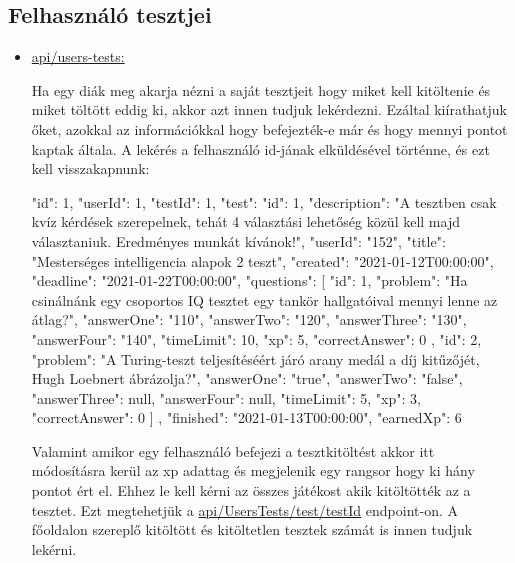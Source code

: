 \subsection{Felhasználó tesztjei}
\begin{itemize}[label={$\bullet$}, topsep=0pt, itemsep=0pt, leftmargin=15pt]
    \item[] {\url{api/users-tests:}}
          \begin{addmargin}[\parindent]{0pt}
              Ha egy diák meg akarja nézni a saját tesztjeit hogy miket kell kitöltenie és miket töltött eddig ki,  akkor azt innen tudjuk lekérdezni. Ezáltal kiírathatjuk őket, azokkal az információkkal hogy befejezték-e már és hogy mennyi pontot kaptak általa. A lekérés a felhasználó id-jának elküldésével történne, és ezt kell visszakapnunk:

              \begin{json}
{
    "id": 1,
    "userId": 1,
    "testId": 1,
    "test": {
        "id": 1,
        "description": "A tesztben csak kvíz kérdések szerepelnek, tehát 4 választási lehetőség közül kell majd választaniuk. Eredményes munkát kívánok!",
        "userId": "152",
        "title": "Mesterséges intelligencia alapok 2 teszt",
        "created": "2021-01-12T00:00:00",
        "deadline": "2021-01-22T00:00:00",
        "questions": [
            {
                "id": 1,
                "problem": "Ha csinálnánk egy csoportos IQ tesztet egy tankör hallgatóival mennyi lenne az átlag?",
                "answerOne": "110",
                "answerTwo": "120",
                "answerThree": "130",
                "answerFour": "140",
                "timeLimit": 10,
                "xp": 5,
                "correctAnswer": 0
            },
            {
                "id": 2,
                "problem": "A Turing-teszt teljesítéséért járó arany medál a díj kitűzőjét, Hugh Loebnert ábrázolja?",
                "answerOne": "true",
                "answerTwo": "false",
                "answerThree": null,
                "answerFour": null,
                "timeLimit": 5,
                "xp": 3,
                "correctAnswer": 0
            }
        ]
},
"finished": "2021-01-13T00:00:00",
"earnedXp": 6
}
              \end{json}

              Valamint amikor egy felhasználó befejezi a tesztkitöltést akkor itt módosításra kerül az xp adattag és megjelenik egy rangsor hogy ki hány pontot ért el. Ehhez le kell kérni az összes játékost akik kitöltötték az a tesztet. Ezt megtehetjük a \url{api/UsersTests/test/testId} endpoint-on. A főoldalon szereplő kitöltött és kitöltetlen tesztek számát is innen tudjuk lekérni.
          \end{addmargin}
\end{itemize}
